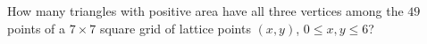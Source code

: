How many triangles with positive area have all three vertices among the $49$ points of a $7\times7$ square grid of lattice points $(x,y)$, $0\le x,y\le6$?
